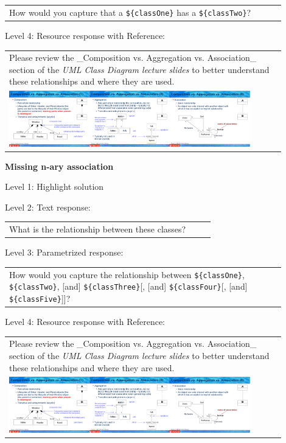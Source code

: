 \begin{tabular}{|p{0.9\linewidth}}
How would you capture that a \verb|${classOne}| has a \verb|${classTwo}|?
\end{tabular} \medskip

\noindent Level 4: Resource response with Reference: \medskip

\begin{tabular}{|p{0.9\linewidth}}
Please review the _Composition vs. Aggregation vs. Association_ section of 
the \textit{UML Class Diagram lecture slides} to 
better understand these relationships and where they are used.

\\
\includegraphics[width=0.9\textwidth]{images/composition_aggregation_association.png}
\end{tabular} \medskip


\noindent \textbf{Missing n-ary association} \medskip

\noindent Level 1: Highlight solution \medskip

\noindent Level 2: Text response: \medskip

\begin{tabular}{|p{0.9\linewidth}}
What is the relationship between these classes?
\end{tabular} \medskip

\noindent Level 3: Parametrized response: \medskip

\begin{tabular}{|p{0.9\linewidth}}
How would you capture the relationship between \verb|${classOne}|, \verb|${classTwo}|, [and] \verb|${classThree}|[, [and] \verb|${classFour}|[, [and] \verb|${classFive}|]]?
\end{tabular} \medskip

\noindent Level 4: Resource response with Reference: \medskip

\begin{tabular}{|p{0.9\linewidth}}
Please review the _Composition vs. Aggregation vs. Association_ section of 
the \textit{UML Class Diagram lecture slides} to 
better understand these relationships and where they are used.

\\
\includegraphics[width=0.9\textwidth]{images/composition_aggregation_association.png}
\end{tabular} \medskip


